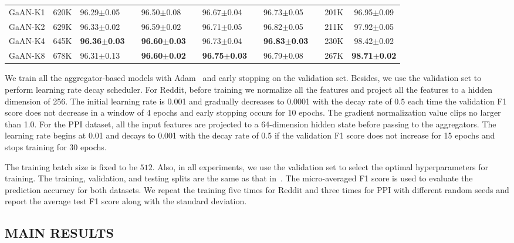 \documentclass{article}
\begin{document}
\begin{table*}[!ht]
\begin{tabular}{l |r m{1.2cm}p{0.01cm} m{1.2cm}p{0.01cm} m{1.2cm}p{0.01cm} m{1.2cm}p{0.01cm} | r c }
			GaAN-K1   & 620K & 96.29$\pm$0.05 && 96.50$\pm$0.08 && 96.67$\pm$0.04 && 96.73$\pm$0.05 && 201K & 96.95$\pm$0.09  \\
			GaAN-K2   & 629K & 96.33$\pm$0.02 && 96.59$\pm$0.02 && 96.71$\pm$0.05 && 96.82$\pm$0.05 && 211K & 97.92$\pm$0.05  \\
			GaAN-K4   & 645K & \textbf{96.36$\pm$0.03} && \textbf{96.60$\pm$0.03} && 96.73$\pm$0.04 && \textbf{96.83$\pm$0.03} && 230K & 98.42$\pm$0.02 \\
			GaAN-K8   & 678K & 96.31$\pm$0.13 && \textbf{96.60$\pm$0.02} && \textbf{96.75$\pm$0.03} && 96.79$\pm$0.08 && 267K & \textbf{98.71$\pm$0.02}  \\
			\hline
		\end{tabular}
		\label{table:result_reddit_ppi}
	\end{table*}
	
	
	We train all the aggregator-based models with Adam~\citep{kingma2014adam} and early stopping on the validation set. Besides, we use the validation set to perform learning rate decay scheduler.  For Reddit, before training we normalize all the features and project all the features to a hidden dimension of 256. The initial learning rate is 0.001 and gradually decreases to 0.0001 with the decay rate of $0.5$ each time the validation F1 score does not decrease in a window of 4 epochs and early stopping occurs for 10 epochs. The gradient normalization value clips no larger than 1.0. 
	For the PPI dataset, all the input features are projected to a 64-dimension hidden state before passing to the aggregators. The learning rate begins at 0.01 and decays to 0.001 with the decay rate of 0.5 if the validation F1 score does not increase for 15 epochs and stops training for 30 epochs. 
	
	The training batch size is fixed to be $512$. Also, in all experiments, we use the validation set to select the optimal hyperparameters for training. The training, validation, and testing splits are the same as that in~\citep{hamilton2017inductive}. The micro-averaged F1 score is used to evaluate the prediction accuracy for both datasets. We repeat the training five times for Reddit and three times for PPI with different random seeds and report the average test F1 score along with the standard deviation.
	
	
	
	
	\subsection{MAIN RESULTS}
	
\end{document}
